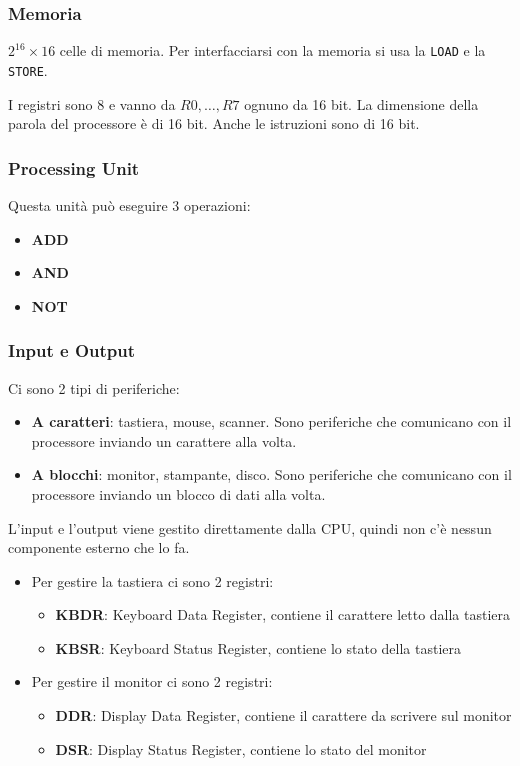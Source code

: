 \documentclass[a4paper]{article}
\theoremstyle{break}
\theoremstyle{break}
\theoremstyle{break}
\theoremstyle{break}
\begin{document}
\subsubsection{Memoria}
\( 2^16 \times 16 \) celle di memoria. Per interfacciarsi con la memoria si usa la
\texttt{LOAD} e la \texttt{STORE}.

\vspace{1em}
\noindent I registri sono 8 e vanno da \( R0, \ldots, R7 \) ognuno da 16 bit. La dimensione
della parola del processore è di 16 bit. Anche le istruzioni sono di 16 bit.

\subsubsection{Processing Unit}
Questa unità può eseguire 3 operazioni:
\begin{itemize}
	\item \textbf{ADD}
	\item \textbf{AND}
	\item \textbf{NOT}
\end{itemize}

\subsubsection{Input e Output}
Ci sono 2 tipi di periferiche:
\begin{itemize}
	\item \textbf{A caratteri}: tastiera, mouse, scanner. Sono periferiche che comunicano
	      con il processore inviando un carattere alla volta.
	\item \textbf{A blocchi}: monitor, stampante, disco. Sono periferiche che comunicano
	      con il processore inviando un blocco di dati alla volta.
\end{itemize}
L'input e l'output viene gestito direttamente dalla CPU, quindi non c'è nessun componente
esterno che lo fa.
\begin{itemize}
	\item Per gestire la tastiera ci sono 2 registri:
	      \begin{itemize}
		      \item \textbf{KBDR}: Keyboard Data Register, contiene il carattere letto dalla tastiera
		      \item \textbf{KBSR}: Keyboard Status Register, contiene lo stato della tastiera
	      \end{itemize}
	\item Per gestire il monitor ci sono 2 registri:
	      \begin{itemize}
		      \item \textbf{DDR}: Display Data Register, contiene il carattere da scrivere sul monitor
		      \item \textbf{DSR}: Display Status Register, contiene lo stato del monitor
	      \end{itemize}
\end{itemize}
\end{document}
